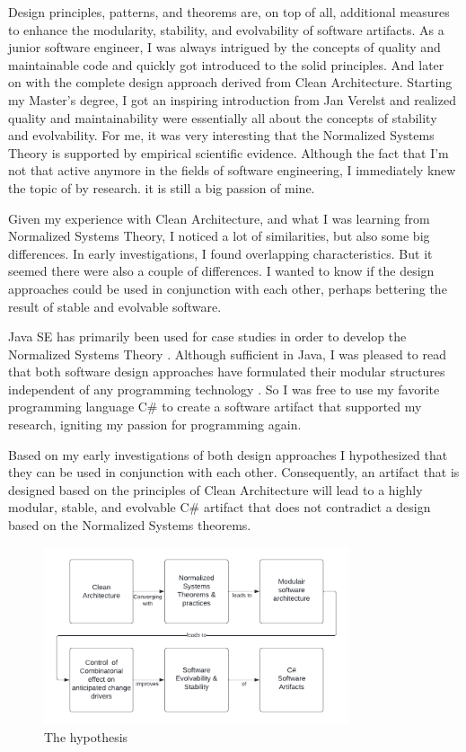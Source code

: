 Design principles, patterns, and theorems are, on top of all, additional measures to
enhance the modularity, stability, and evolvability of software artifacts. As a junior
software engineer, I was always intrigued by the concepts of quality and maintainable code
and quickly got introduced to the \gls{solid} principles. And later on with the complete
design approach derived from Clean Architecture. Starting my Master's degree, I got an
inspiring introduction from Jan Verelst and realized quality and maintainability were
essentially all about the concepts of stability and evolvability. For me, it was very
interesting that the Normalized Systems Theory is supported by empirical scientific
evidence. Although the fact that I'm not that active anymore in the fields of software
engineering, I immediately knew the topic of by research. it is still a big passion of
mine.

Given my experience with Clean Architecture, and what I was learning from Normalized
Systems Theory, I noticed a lot of similarities, but also some big differences. In early
investigations, I found overlapping characteristics. But it seemed there were also a couple
of differences. I wanted to know if the design approaches could be used in conjunction with
each other, perhaps bettering the result of stable and evolvable software.

Java SE has primarily been used for case studies in order to develop the Normalized
Systems Theory \parencite{oorts_building_2014, de_bruyn_enabling_2018}. Although
sufficient in Java, I was pleased to read that both software design approaches have
formulated their modular structures independent of any programming technology
\parencite{mannaert_normalized_2009,robert_c_martin_clean_2018}. So I was free to use my
favorite programming language C\# to create a software artifact that supported my
research, igniting my passion for programming again. 

Based on my early investigations of both design approaches I hypothesized that they can be
used in conjunction with each other. Consequently, an artifact that is designed based on
the principles of Clean Architecture will lead to a highly modular, stable, and evolvable
C\# artifact that does not contradict a design based on the Normalized Systems theorems.

\begin{figure}[H]
    \centering
    \includegraphics[width=0.8\textwidth]{Figures/hypothesis.pdf}
    \caption[The hypothesis]{The hypothesis}
    \label{fig_hypothesis}
\end{figure}




